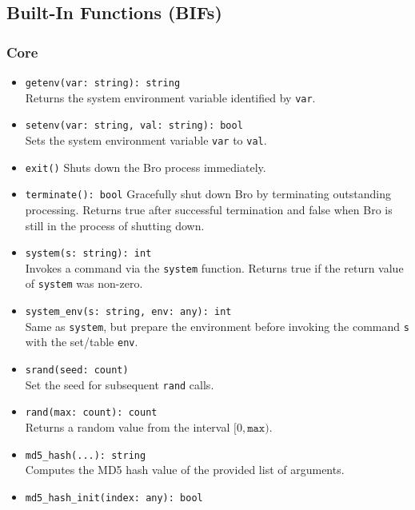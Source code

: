 \documentclass[10pt,landscape]{article}
\begin{document}
\begin{multicols*}{2}
\subsection*{Built-In Functions (BIFs)}
\linespread{0.9}

\subsubsection*{Core}

\begin{itemize}
  \item \verb|getenv(var: string): string|\\
    Returns the system environment variable identified by \texttt{var}.
  \item \verb|setenv(var: string, val: string): bool|\\
    Sets the system environment variable \texttt{var} to \texttt{val}.
  \item \verb|exit()|
    Shuts down the Bro process immediately.
  \item \verb|terminate(): bool|
    Gracefully shut down Bro by terminating outstanding processing. Returns
    true after successful termination and false when Bro is still in the
    process of shutting down.
  \item \verb|system(s: string): int|\\
    Invokes a command via the \texttt{system} function.
    Returns true if the return value of \texttt{system} was non-zero.
  \item \verb|system_env(s: string, env: any): int|\\
    Same as \verb|system|, but prepare the environment before invoking the
    command \texttt{s} with the set/table \texttt{env}.
  \item \verb|srand(seed: count)|\\
    Set the seed for subsequent \verb|rand| calls.
  \item \verb|rand(max: count): count|\\
    Returns a random value from the interval $[0, \mathtt{max})$.
  \item \verb|md5_hash(...): string|\\
    Computes the MD5 hash value of the provided list of arguments.
  \item \verb|md5_hash_init(index: any): bool|\\

\end{itemize}
\end{multicols*}
\end{document}
